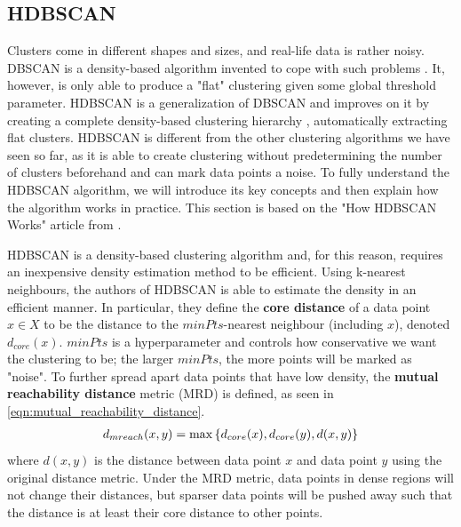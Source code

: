 \subsection{HDBSCAN}
\label{sec:hdbscan-clustering}
Clusters come in different shapes and sizes, and real-life data is rather noisy. DBSCAN is a density-based algorithm invented to cope with such problems \cite{Ester1996}. It, however, is only able to produce a "flat" clustering given some global threshold parameter. HDBSCAN is a generalization of DBSCAN and improves on it by creating a complete density-based clustering hierarchy \cite{Campello2013}, automatically extracting flat clusters. HDBSCAN is different from the other clustering algorithms we have seen so far, as it is able to create clustering without predetermining the number of clusters beforehand and can mark data points a noise. To fully understand the HDBSCAN algorithm, we will introduce its key concepts and then explain how the algorithm works in practice. This section is based on the "How HDBSCAN Works" article from \cite{how-hdbscan-works-2016}.

HDBSCAN is a density-based clustering algorithm and, for this reason, requires an inexpensive density estimation method to be efficient. Using k-nearest neighbours, the authors of HDBSCAN is able to estimate the density in an efficient manner. In particular, they define the \textbf{core distance} of a data point $x \in X$ to be the distance to the $\textit{minPts}$-nearest neighbour (including $x$), denoted $d_{core}(x)$. $\textit{minPts}$ is a hyperparameter and controls how conservative we want the clustering to be; the larger $\textit{minPts}$, the more points will be marked as "noise". To further spread apart data points that have low density, the \textbf{mutual reachability distance} metric (MRD) is defined, as seen in \cref{eqn:mutual_reachability_distance}.
\begin{align}
    d_{mreach}(x, y) = \max \left\{ d_{core}(x), d_{core}(y), d(x, y) \right\}
    \label{eqn:mutual_reachability_distance}
\end{align}
where $d(x, y)$ is the distance between data point $x$ and data point $y$ using the original distance metric. Under the MRD metric, data points in dense regions will not change their distances, but sparser data points will be pushed away such that the distance is at least their core distance to other points.

